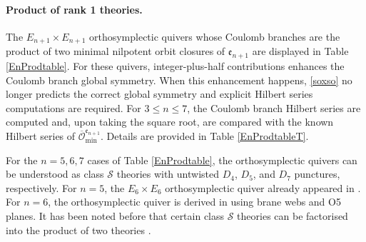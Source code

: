 \documentclass[a4paper,11pt]{article}
\begin{document}
\paragraph{Product of rank 1 theories.}
The $E_{n+1}\times E_{n+1}$  orthosymplectic quivers whose Coulomb branches are the product of two minimal nilpotent orbit closures of $\mathfrak{e}_{n+1}$ are displayed in Table \ref{EnProdtable}. For these quivers, integer-plus-half contributions enhances the Coulomb branch global symmetry. When this enhancement happens, \eqref{soxso} no longer predicts the correct global symmetry and explicit Hilbert series computations are required. 
% 
For $3\leq n \leq 7$, the Coulomb branch Hilbert series are computed and, upon taking the square root, are compared with the known Hilbert series of $\overline{\mathcal{O}}^{\mathfrak{e}_{n+1}}_{\mathrm{min}}$. Details are provided in Table \ref{EnProdtableT}.


For the $n=5,6,7$ cases of Table \ref{EnProdtable}, the orthosymplectic quivers can be understood as class $\mathcal{S}$ theories with untwisted $D_4$, $D_5$, and $D_7$ punctures, respectively. For $n=5$, the $E_6\times E_6$  orthosymplectic quiver already appeared in \cite{Chacaltana:2011ze}. For $n=6$, the orthosymplectic quiver is derived in \cite{Akhond:2021knl} using brane webs and O5 planes. It has been noted before that certain class $\mathcal{S}$ theories can be factorised into the product of two theories  
\cite{Distler:2017xba,Distler:2018gbc,Ergun:2020fnm}.
\end{document}
